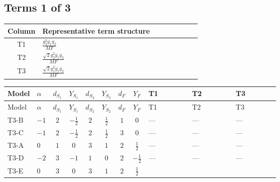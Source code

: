 \documentclass[8pt]{article}
\begin{document}
\begin{landscape}
\subsection*{Terms 1 of 3}
\begin{center}
\begin{tabular}{@{}c >{\raggedright\arraybackslash}p{0.82\linewidth}@{}}
\toprule
Column & Representative term structure \\
\midrule
T1 & \(\displaystyle \frac{g_{2}^{2} \overline{y_{1}} \overline{y_{2}}}{MF}\) \\
\midrule
T2 & \(\displaystyle \frac{\sqrt{2} g_{2}^{2} \overline{y_{1}} \overline{y_{2}}}{MF}\) \\
\midrule
T3 & \(\displaystyle \frac{\sqrt{2} g_{1}^{2} \overline{y_{1}} \overline{y_{2}}}{MF}\) \\
\midrule
\bottomrule
\end{tabular}
\end{center}
\smallskip
\tiny
\begin{longtable}{@{}llcccccc >{\raggedright\arraybackslash}p{0.21\linewidth} >{\raggedright\arraybackslash}p{0.21\linewidth} >{\raggedright\arraybackslash}p{0.21\linewidth}@{}}
\toprule
Model & $\alpha$ & $d_{S_1}$ & $Y_{S_1}$ & $d_{S_2}$ & $Y_{S_2}$ & $d_F$ & $Y_F$ & T1 & T2 & T3 \\
\midrule
\endfirsthead
\toprule
Model & $\alpha$ & $d_{S_1}$ & $Y_{S_1}$ & $d_{S_2}$ & $Y_{S_2}$ & $d_F$ & $Y_F$ & T1 & T2 & T3 \\
\midrule
\endhead
T3-B & $-1$ & $2$ & $-\frac{1}{2}$ & $2$ & $\frac{1}{2}$ & $1$ & $0$ & --- & --- & --- \\
\midrule
T3-C & $-1$ & $2$ & $-\frac{1}{2}$ & $2$ & $\frac{1}{2}$ & $3$ & $0$ & --- & --- & --- \\
\midrule
T3-A & $0$ & $1$ & $0$ & $3$ & $1$ & $2$ & $\frac{1}{2}$ & --- & --- & --- \\
\midrule
T3-D & $-2$ & $3$ & $-1$ & $1$ & $0$ & $2$ & $-\frac{1}{2}$ & --- & --- & --- \\
\midrule
T3-E & $0$ & $3$ & $0$ & $3$ & $1$ & $2$ & $\frac{1}{2}$ & \scriptsize\adjustbox{max width=\linewidth}{$\begin{gathered} - \frac{g_{2}^{2} \overline{y_{1}} \overline{y_{2}}}{MF}\end{gathered}$} & \scriptsize\adjustbox{max width=\linewidth}{$\begin{gathered} - \frac{49 \sqrt{2} g_{2}^{2} \overline{y_{1}} \overline{y_{2}}}{16 MF}\end{gathered}$} & \scriptsize\adjustbox{max width=\linewidth}{$\begin{gathered} - \frac{3 \sqrt{2} g_{1}^{2} \overline{y_{1}} \overline{y_{2}}}{16 MF}\end{gathered}$} \\
\midrule
\bottomrule
\end{longtable}
\clearpage

\end{landscape}
\end{document}
